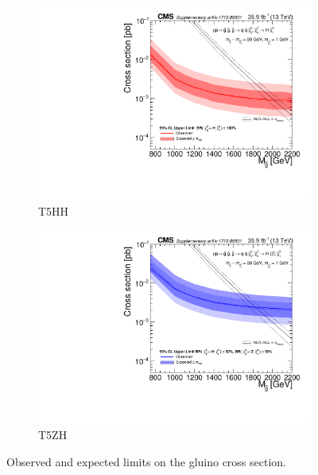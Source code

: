 \begin{figure}[hbp!]
\centering
\begin{subfigure}[b]{0.49\textwidth}
\includegraphics[width=\textwidth]{figs/brazilT5HHResults.pdf}
\caption{T5HH}
\end{subfigure}
\begin{subfigure}[b]{0.49\textwidth}
\includegraphics[width=\textwidth]{figs/brazilT5HZResults.pdf}
\caption{T5ZH}
\end{subfigure}
\caption{Observed and expected limits on the gluino cross section.}
\label{fig:brazil}
\end{figure}
